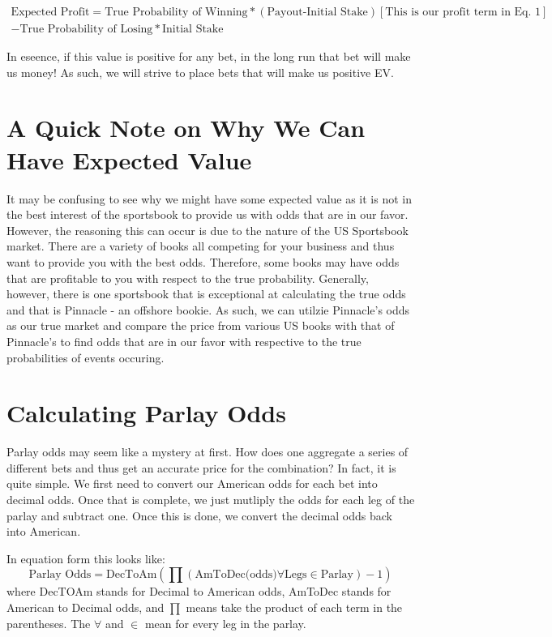 \documentclass{article}
\begin{document}
\begin{multline}
  \textrm{Expected Profit} = \textrm{True Probability of Winning}*(\textrm{Payout-Initial Stake})[\textrm{This is our profit term in Eq. 1}] \\- \textrm{True Probability of Losing}*\textrm{Initial Stake}
\end{multline}

In eseence, if this value is positive for any bet, in the long run that bet will make us money! As such, we will strive to place bets that will make us positive EV. 

\section{A Quick Note on Why We Can Have Expected Value}
It may be confusing to see why we might have some expected value as it is not in the best interest of the sportsbook to provide us with odds that are in our favor. However, the reasoning this can occur is due to the nature of the US Sportsbook market. There are a variety of books all competing for your business and thus want to provide you with the best odds. Therefore, some books may have odds that are profitable to you with respect to the true probability. Generally, however, there is one sportsbook  that is exceptional at calculating the true odds and that is Pinnacle - an offshore bookie. As such, we can utilzie Pinnacle's odds as our true market and compare the price from various US books with that of Pinnacle's to find odds that are in our favor with respective to the true probabilities of events occuring.

\section{Calculating Parlay Odds}
Parlay odds may seem like a mystery at first. How does one aggregate a series of different bets and thus get an accurate price for the combination? In fact, it is quite simple. We first need to convert our American odds for each bet into decimal odds. Once that is complete, we just mutliply the odds for each leg of the parlay and subtract one. Once this is done, we convert the decimal odds back into American. 

In equation form this looks like:
\begin{equation}
  \textrm{Parlay Odds} = \textrm{DecToAm} (\prod (\textrm{AmToDec(odds)} \forall \textrm{Legs} \in \textrm{Parlay})-1)
\end{equation}
where DecTOAm stands for Decimal to American odds, AmToDec stands for American to Decimal odds, and $\prod$ means take the product of each term in the parentheses. The $\forall$ and $\in$ mean for every leg in the parlay. 
\end{document}
